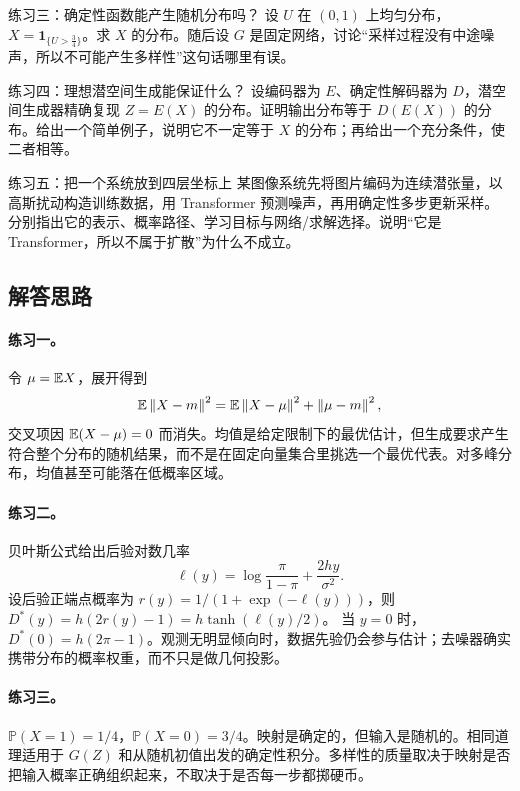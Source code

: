\begin{exercisebox}{练习三：确定性函数能产生随机分布吗？}
设 $U$ 在 $(0,1)$ 上均匀分布，$X=\mathbf 1_{\{U>\frac34\}}$。求 $X$ 的分布。随后设 $G$ 是固定网络，讨论“采样过程没有中途噪声，所以不可能产生多样性”这句话哪里有误。
\end{exercisebox}

\begin{exercisebox}{练习四：理想潜空间生成能保证什么？}
设编码器为 $E$、确定性解码器为 $D$，潜空间生成器精确复现 $Z=E(X)$ 的分布。证明输出分布等于 $D(E(X))$ 的分布。给出一个简单例子，说明它不一定等于 $X$ 的分布；再给出一个充分条件，使二者相等。
\end{exercisebox}

\begin{exercisebox}{练习五：把一个系统放到四层坐标上}
某图像系统先将图片编码为连续潜张量，以高斯扰动构造训练数据，用 Transformer 预测噪声，再用确定性多步更新采样。分别指出它的表示、概率路径、学习目标与网络/求解选择。说明“它是 Transformer，所以不属于扩散”为什么不成立。
\end{exercisebox}

\subsection*{解答思路}

\paragraph{练习一。}
令 $\mu=\mathbb{E} X$，展开得到
\[
 \mathbb{E}\left\lVert X-m\right\rVert^2
 =\mathbb{E}\left\lVert X-\mu\right\rVert^2+\left\lVert\mu-m\right\rVert^2,
\]
交叉项因 $\mathbb{E}(X-\mu)=0$ 而消失。均值是给定限制下的最优估计，但生成要求产生符合整个分布的随机结果，而不是在固定向量集合里挑选一个最优代表。对多峰分布，均值甚至可能落在低概率区域。

\paragraph{练习二。}
贝叶斯公式给出后验对数几率
\[
 \ell(y)=\log\frac{\pi}{1-\pi}+\frac{2hy}{\sigma^2}.
\]
设后验正端点概率为 $r(y)=1/(1+\exp(-\ell(y)))$，则
$D^*(y)=h(2r(y)-1)=h\tanh(\ell(y)/2)$。
当 $y=0$ 时，$D^*(0)=h(2\pi-1)$。观测无明显倾向时，数据先验仍会参与估计；去噪器确实携带分布的概率权重，而不只是做几何投影。

\paragraph{练习三。}
$\mathbb P(X=1)=1/4$，$\mathbb P(X=0)=3/4$。映射是确定的，但输入是随机的。相同道理适用于 $G(Z)$ 和从随机初值出发的确定性积分。多样性的质量取决于映射是否把输入概率正确组织起来，不取决于是否每一步都掷硬币。

